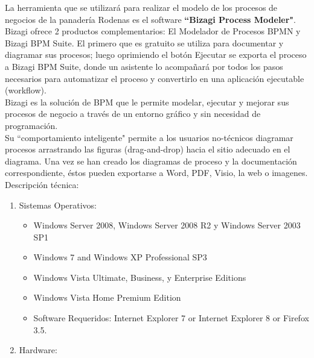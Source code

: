 La herramienta que se utilizará para realizar el modelo de los procesos de negocios de la panadería Rodenas es el software \textbf{``Bizagi Process Modeler"}.
\\

Bizagi ofrece 2 productos complementarios: El Modelador de Procesos BPMN y Bizagi BPM Suite. El primero que es gratuito se utiliza para documentar y diagramar sus procesos; luego oprimiendo el botón Ejecutar se exporta el proceso a Bizagi BPM Suite, donde un asistente lo acompañará por todos los pasos necesarios para automatizar el proceso y convertirlo en una aplicación ejecutable (workflow).
\\
Bizagi es la solución de BPM que le permite modelar, ejecutar y mejorar sus procesos de negocio a través de un entorno gráfico y sin necesidad de programación.
\\
Su ``comportamiento inteligente" permite a los usuarios no-técnicos diagramar procesos arrastrando las figuras (drag-and-drop) hacia el sitio adecuado en el diagrama. Una vez se han creado los diagramas de proceso y la documentación correspondiente, éstos pueden exportarse a Word, PDF, Visio, la web o imagenes.
\\
Descripción técnica:
\begin{enumerate}

\item Sistemas Operativos:
\begin{itemize}
\item Windows Server 2008, Windows Server 2008 R2 y Windows Server 2003 SP1
\item Windows 7 and Windows XP Professional SP3 
\item Windows Vista Ultimate, Business, y Enterprise Editions
\item Windows Vista Home Premium Edition
\\
\item Software Requeridos: Internet Explorer 7 or Internet Explorer 8 or Firefox 3.5.
\end{itemize}

\item Hardware:
\end{enumerate}



